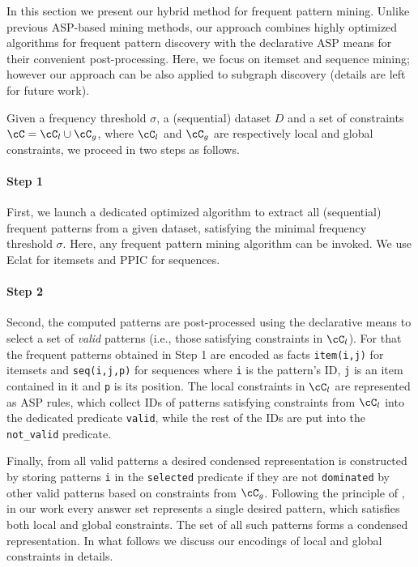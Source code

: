 In this section we present our hybrid method for frequent pattern mining. Unlike previous ASP-based mining methods, our approach combines highly optimized algorithms for frequent pattern discovery with the declarative ASP means for their convenient post-processing. Here, we focus on itemset and sequence mining; however our approach can be also applied to subgraph discovery (details are left for future work). 

Given a frequency threshold $\sigma$, a (sequential) dataset $D$ and a set of constraints $\cC=\cC_l\cup\cC_g$, where $\cC_l$ and $\cC_g$ are respectively local and global constraints, we proceed in two steps as follows. 
\bigskip

\paragraph{Step 1} First, we launch a dedicated optimized algorithm to extract all (sequential) frequent patterns from a given dataset, satisfying the minimal frequency threshold $\sigma$. Here, any frequent pattern mining algorithm can be invoked. %
We use Eclat \parencite{eclat} for itemsets and PPIC \parencite{PPIC} for sequences.
\bigskip

\paragraph{Step 2} Second, the computed patterns are post-processed using the declarative means to select a set of \emph{valid} patterns (i.e., those satisfying constraints in $\cC_l$). For that the frequent patterns obtained in Step 1 are encoded as facts \texttt{item(i,j)} for itemsets and \texttt{seq(i,j,p)} for sequences where \texttt{i} is the pattern's ID, \texttt{j} is an item contained in it and \texttt{p} is its position. The local constraints in $\cC_l$ are represented as ASP rules, which collect IDs of patterns satisfying constraints from $\cC_l$ into the dedicated predicate \texttt{valid}, while the rest of the IDs are put into the \texttt{not\_valid} predicate. 

Finally, from all valid patterns a desired condensed representation is constructed by storing patterns \texttt{i} in the \texttt{selected} predicate if they are not \texttt{dominated} by other valid patterns based on constraints from $\cC_g$. Following the principle of \parencite{DBLP:conf/lpnmr/Jarvisalo11}, in our work every answer set represents a single desired pattern, which satisfies both local and global constraints. The set of all such patterns forms a condensed representation. In what follows we discuss our encodings of local and global constraints in details. 



